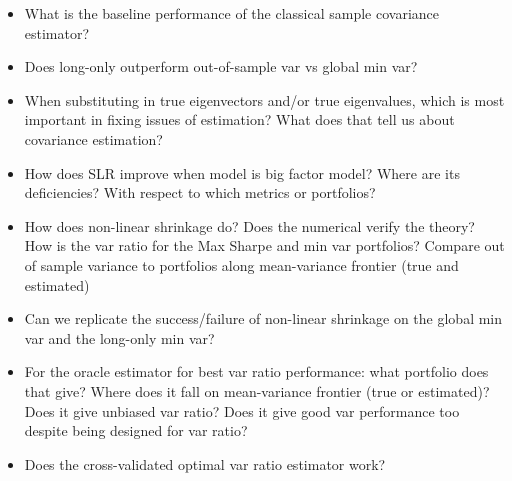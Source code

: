 \documentclass{article}
\begin{document}
\begin{itemize}
	\item What is the baseline performance of the classical sample covariance estimator?
	
	\item Does long-only outperform out-of-sample var vs global min var?

	\item When substituting in true eigenvectors and/or true eigenvalues, which is most important in fixing issues of estimation?  What does that tell us about covariance estimation?

	\item How does SLR improve when model is big factor model?  Where are its deficiencies?  With respect to which metrics or portfolios?
	
	\item How does non-linear shrinkage do?  Does the numerical verify the theory?  How is the var ratio for the Max Sharpe and min var portfolios?  Compare out of sample variance to portfolios along mean-variance frontier (true and estimated)
	
	\item Can we replicate the success/failure of non-linear shrinkage on the global min var and the long-only min var?
	
	\item For the oracle estimator for best var ratio performance: what portfolio does that give? Where does it fall on mean-variance frontier (true or estimated)?  Does it give unbiased var ratio? Does it give good var performance too despite being designed for var ratio?
	
	\item Does the cross-validated optimal var ratio estimator work?
\end{itemize}







\end{document}
